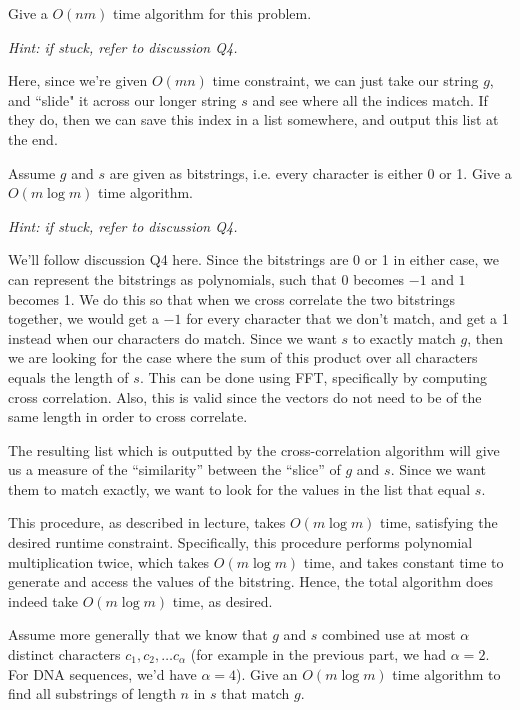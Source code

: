 \documentclass[11pt]{article}
\begin{document}
\begin{subparts}
\subpart Give a $O(nm)$ time algorithm for this problem.

\emph{Hint: if stuck, refer to discussion Q4.}

\begin{solution}
	Here, since we're given $O(mn)$ time constraint, we can just take our string $g$, and ``slide" it across 
	our longer string $s$ and see where all the indices match. If they do, then we can save this index 
	in a list somewhere, and output this list at the end.
\end{solution}

\subpart Assume $g$ and $s$ are given as bitstrings, i.e. every character is either 0 or 1. Give a $O(m\log m)$ time algorithm. 

\emph{Hint: if stuck, refer to discussion Q4.}

\begin{solution}
	We'll follow discussion Q4 here. Since the bitstrings are 0 or 1 in either case, we can 
	represent the bitstrings as polynomials, such that $0$ becomes $-1$ and $1$ becomes 1. We do this 
	so that when we cross correlate the two bitstrings together, we would get a $-1$ for every character that 
	we don't match, and get a 1 instead when our characters do match. Since we want $s$ to exactly match $g$, 
	then we are looking for the case where the sum of this product over all characters equals the length of $s$.
	This can be done using FFT, specifically by computing cross correlation. Also, this is valid since 
	the vectors do not need to be of the same length in order to cross correlate.  

	The resulting
	list which is outputted by the cross-correlation algorithm will give us a measure of the ``similarity''
	between the ``slice'' of $g$ and $s$. Since we want them to match exactly, we want to look for the values 
	in the list that equal $s$. 

	This procedure, as described in lecture, takes $O(m \log m)$ time, satisfying the desired runtime constraint. 
	Specifically, this procedure performs polynomial multiplication twice, which takes $O(m \log m)$ time,
	and takes constant time to generate and access the values of the bitstring. Hence, the total algorithm 
	does indeed take $O(m \log m)$ time, as desired.
\end{solution}

\subpart Assume more generally that we know that $g$ and $s$ combined use at most $\alpha$ distinct characters $c_1, c_2, \ldots c_\alpha$ 
(for example in the previous part, we had $\alpha = 2$. For DNA sequences, we'd have $\alpha = 4$). Give an $O(m \log m)$ time algorithm to find all substrings of length $n$ in $s$ that match $g$.


\end{subparts}
\end{document}
